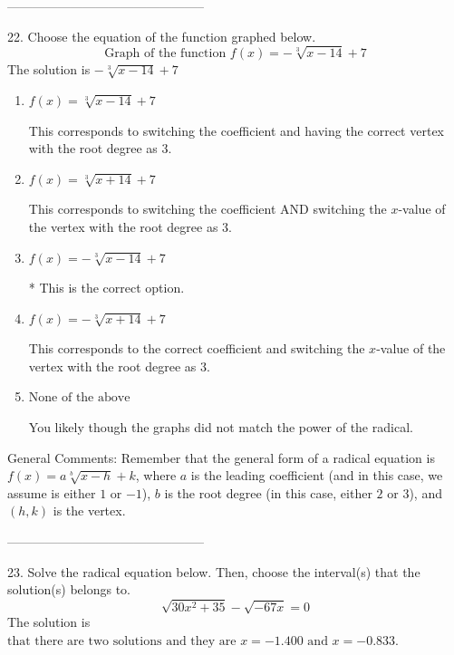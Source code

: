 \documentclass{article}[14pt]
\begin{document}
-----------------------------------------------

22. Choose the equation of the function graphed below.
$$ \text{Graph of the function } f(x) = - \sqrt[3]{x - 14} + 7 $$ 
The solution is $ - \sqrt[3]{x - 14} + 7 $ 

\begin{enumerate}[label=\Alph*.] 
\item $ f(x) = \sqrt[3]{x - 14} + 7 $ 

 This corresponds to switching the coefficient and having the correct vertex with the root degree as $3$. 
\item $ f(x) = \sqrt[3]{x + 14} + 7 $ 

 This corresponds to switching the coefficient AND switching the $x$-value of the vertex with the root degree as $3$. 
\item $ f(x) = - \sqrt[3]{x - 14} + 7 $ 

 * This is the correct option. 
\item $ f(x) = - \sqrt[3]{x + 14} + 7 $ 

 This corresponds to the correct coefficient and switching the $x$-value of the vertex with the root degree as $3$. 
\item $ \text{None of the above} $ 

 You likely though the graphs did not match the power of the radical. 
\end{enumerate} 
 
General Comments: Remember that the general form of a radical equation is $ f(x) = a \sqrt[b]{x - h} + k$, where $a$ is the leading coefficient (and in this case, we assume is either $1$ or $-1$), $b$ is the root degree (in this case, either $2$ or $3$), and $(h, k)$ is the vertex.

-----------------------------------------------

23. Solve the radical equation below. Then, choose the interval(s) that the solution(s) belongs to.
$$ \sqrt{30 x^2 + 35} - \sqrt{-67 x} = 0 $$ 
The solution is $ \text{that there are two solutions and they are } x = -1.400 \text{ and } x = -0.833. $ 
\end{document}
